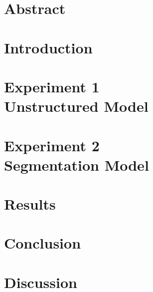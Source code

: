 \documentclass[a4paper, 12pt]{report}
\begin{document}
\setcounter{page}{1}
\pagestyle{plain} 

\chapter*{Abstract}


\tableofcontents

\chapter{Introduction}


\chapter{Experiment 1 \\ Unstructured Model}
\label{ch:repl}


\chapter{Experiment 2 \\ Segmentation Model}


\chapter{Results}


\chapter{Conclusion}


\chapter{Discussion}





\appendix

\end{document}
